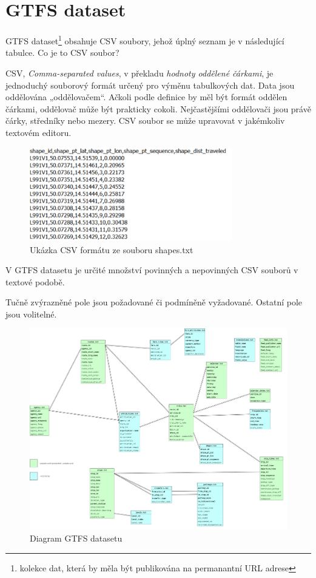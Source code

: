 
\section{GTFS dataset}
GTFS dataset\footnote{kolekce dat, která by měla být publikována na permanantní URL adrese}
obsahuje CSV soubory, jehož úplný seznam je v následující tabulce. Co je to CSV soubor?

CSV, \textit{Comma-separated values}, v překladu \textit{hodnoty oddělené čárkami}, je jednoduchý 
souborový formát určený pro výměnu tabulkových dat. Data jsou oddělována „oddělovačem“.
Ačkoli podle definice by měl být formát oddělen čárkami, oddělovač může být prakticky cokoli. 
Nejčastějšími oddělovači jsou právě čárky, středníky nebo mezery. CSV soubor se 
může upravovat v jakémkoliv textovém editoru.
\begin{figure}[H] \centering
    \includegraphics[width=250pt]{./pictures/ukazka-csv.PNG}
    \caption[Ukázka CSV formátu ze souboru shapes.txt]{Ukázka CSV formátu ze souboru shapes.txt}
	\label{fig:ukazka-csv}              
\end{figure}
V GTFS datasetu je určité množství povinných a nepovinných CSV souborů v textové podobě.
 

Tučně zvýrazněné pole jsou požadované či podmíněně vyžadované. Ostatní pole jsou 
volitelné. 
\begin{figure}[H] \centering
    \includegraphics[width=400pt]{./pictures/GTFS-diagram.PNG}
    \caption[Diagram GTFS datasetu]{Diagram GTFS datasetu}
	\label{fig:GTFS-diagram}              
\end{figure}

